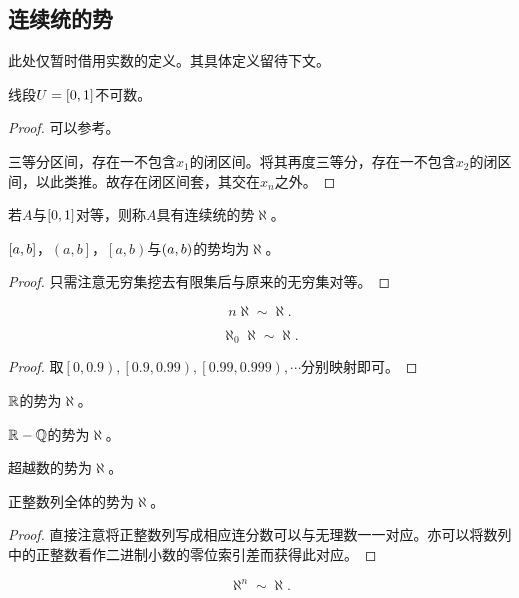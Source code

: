\documentclass{ctexrep}
\begin{document}
  \subsection{连续统的势}
  此处仅暂时借用实数的定义。其具体定义留待下文。
  \begin{theorem}
    线段$U=\left[0,1\right]$不可数。
  \end{theorem}
  \begin{proof}
    可以参考。
    \par
    三等分区间，存在一不包含$x_1$的闭区间。将其再度三等分，存在一不包含$x_2$的闭区间，以此类推。故存在闭区间套，其交在$x_n$之外。
  \end{proof}
  \begin{definition}
    若$A$与$\left[0,1\right]$对等，则称$A$具有连续统的势$\aleph$。
  \end{definition}
  \begin{theorem}
    $\left[a,b\right]$，$\left(a,b\right]$，$\left[a,b\right)$与$\left(a,b\right)$的势均为$\aleph$。
  \end{theorem}
  \begin{proof}
    只需注意无穷集挖去有限集后与原来的无穷集对等。
  \end{proof}
  \begin{theorem}
    \[ n\aleph\sim\aleph. \]
  \end{theorem}
  \begin{theorem}
    \[ \aleph_0\aleph\sim\aleph. \]
  \end{theorem}
  \begin{proof}
    取$\left[0,0.9\right),\left[0.9,0.99\right),\left[0.99,0.999\right),\cdots$分别映射即可。
  \end{proof}
  \begin{collary}
    $\mathbb{R}$的势为$\aleph$。
  \end{collary}
  \begin{collary}
    $\mathbb{R}-\mathbb{Q}$的势为$\aleph$。
  \end{collary}
  \begin{collary}
    超越数的势为$\aleph$。
  \end{collary}
  \begin{theorem}
    正整数列全体的势为$\aleph$。
  \end{theorem}
  \begin{proof}
    直接注意将正整数列写成相应连分数可以与无理数一一对应。亦可以将数列中的正整数看作二进制小数的零位索引差而获得此对应。
  \end{proof}
  \begin{theorem}
    \[ \aleph^n \sim \aleph. \]
  \end{theorem}
\end{document}
